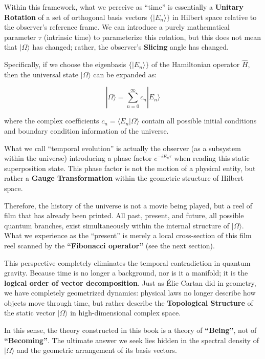Within this framework, what we perceive as ``time'' is essentially a \textbf{Unitary Rotation} of a set of orthogonal basis vectors $\{ |E_n\rangle \}$ in Hilbert space relative to the observer's reference frame. We can introduce a purely mathematical parameter $\tau$ (intrinsic time) to parameterize this rotation, but this does not mean that $|\Omega\rangle$ has changed; rather, the observer's \textbf{Slicing} angle has changed.

Specifically, if we choose the eigenbasis $\{ |E_n\rangle \}$ of the Hamiltonian operator $\hat{H}$, then the universal state $|\Omega\rangle$ can be expanded as:

\[|\Omega\rangle = \sum_{n=0}^{\infty} c_n |E_n\rangle\]

where the complex coefficients $c_n = \langle E_n | \Omega \rangle$ contain all possible initial conditions and boundary condition information of the universe.

What we call ``temporal evolution'' is actually the observer (as a subsystem within the universe) introducing a phase factor $e^{-i E_n \tau}$ when reading this static superposition state. This phase factor is not the motion of a physical entity, but rather a \textbf{Gauge Transformation} within the geometric structure of Hilbert space.

Therefore, the history of the universe is not a movie being played, but a reel of film that has already been printed. All past, present, and future, all possible quantum branches, exist simultaneously within the internal structure of $|\Omega\rangle$. What we experience as the ``present'' is merely a local cross-section of this film reel scanned by the \textbf{``Fibonacci operator''} (see the next section).

This perspective completely eliminates the temporal contradiction in quantum gravity. Because time is no longer a background, nor is it a manifold; it is the \textbf{logical order of vector decomposition}. Just as \'{E}lie Cartan did in geometry, we have completely geometrized dynamics: physical laws no longer describe how objects move through time, but rather describe the \textbf{Topological Structure} of the static vector $|\Omega\rangle$ in high-dimensional complex space.

In this sense, the theory constructed in this book is a theory of \textbf{``Being''}, not of \textbf{``Becoming''}. The ultimate answer we seek lies hidden in the spectral density of $|\Omega\rangle$ and the geometric arrangement of its basis vectors.

